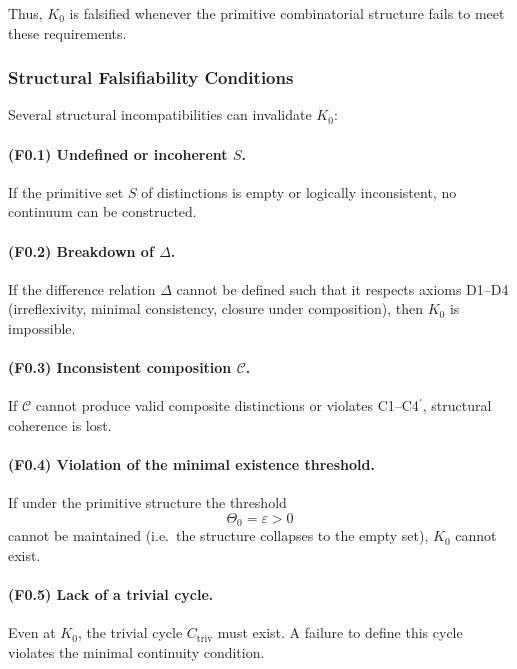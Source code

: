 Thus, $K_0$ is falsified whenever the primitive combinatorial structure
fails to meet these requirements.



\subsubsection{Structural Falsifiability Conditions}

Several structural incompatibilities can invalidate $K_0$:

\paragraph{(F0.1) Undefined or incoherent \texorpdfstring{$S$}{S}.}
If the primitive set $S$ of distinctions is empty or logically
inconsistent, no continuum can be constructed.

\paragraph{(F0.2) Breakdown of \texorpdfstring{$\Delta$}{\Delta}.}
If the difference relation $\Delta$ cannot be defined such that it
respects axioms D1–D4 (irreflexivity, minimal consistency, closure
under composition), then $K_0$ is impossible.

\paragraph{(F0.3) Inconsistent composition $\mathcal{C}$.}
If $\mathcal{C}$ cannot produce valid composite distinctions or violates
C1–C4$^\prime$, structural coherence is lost.

\paragraph{(F0.4) Violation of the minimal existence threshold.}
If under the primitive structure the threshold
\[
\Theta_0 = \varepsilon>0
\]
cannot be maintained (i.e.\ the structure collapses to the empty set),
$K_0$ cannot exist.

\paragraph{(F0.5) Lack of a trivial cycle.}
Even at $K_0$, the trivial cycle $C_{\mathrm{triv}}$ must exist.
A failure to define this cycle violates the minimal continuity condition.

